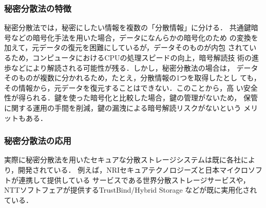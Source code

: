 \subsubsection{秘密分散法の特徴}
秘密分散法では，秘密にしたい情報を複数の「分散情報」に分ける．
共通鍵暗号などの暗号化手法を用いた場合，データになんらかの暗号化のため
の変換を加えて，元データの復元を困難にしているが，データそのものが内包
されているため，コンピュータにおけるCPUの処理スピードの向上，暗号解読技
術の進歩などにより解読される可能性が残る．しかし，秘密分散法の場合は，
データそのものが複数に分かれるため，たとえ，分散情報の1つを取得したとし
ても，その情報から，元データを復元することはできない．このことから，高
い安全性が得られる．鍵を使った暗号化と比較した場合，鍵の管理がないため，
保管に関する運用の手間を削減，鍵の漏洩による暗号解読リスクがないという
メリットもある\cite{sdsm}．

\subsubsection{秘密分散法の応用}
実際に秘密分散法を用いたセキュアな分散ストレージシステムは既に各社により，開発されている．
例えば，NRIセキュアテクノロジーズと日本マイクロソフトが連携して提供している
サービスである世界分散ストレージサービス\cite{nrimicrosoft}や，
NTTソフトフェアが提供するTrustBind/Hybrid Storage\cite{ntt}
などが既に実用化されている．
